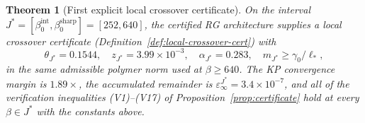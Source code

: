 \documentclass[11pt]{article}
\newtheorem{theorem}{Theorem}[section]
\theoremstyle{definition}
\begin{document}
\begin{theorem}[First explicit local crossover certificate]
\label{thm:first-crossover-certificate}
On the interval $J^*=[\beta_0^{\mathrm{int}},\beta_0^{\mathrm{sharp}}]
=[252,640]$, the certified RG architecture supplies a local
crossover certificate \textup{(}Definition~\ref{def:local-crossover-cert}\textup{)}
with
\[
\theta_{J^*}=0.1544,\quad
z_{J^*}=3.99\times 10^{-3},\quad
\alpha_{J^*}=0.283,\quad
m_{J^*}\ge\gamma_0/\ell_*,
\]
in the same admissible polymer norm used at $\beta\ge 640$.
The KP convergence margin is $1.89\times$, the accumulated remainder
is $\varepsilon_\infty^{J^*}=3.4\times 10^{-7}$, and all of the
verification inequalities \textup{(V1)--(V17)} of
Proposition~\ref{prop:certificate} hold at every $\beta\in J^*$ with
the constants above.
\end{theorem}
\end{document}
